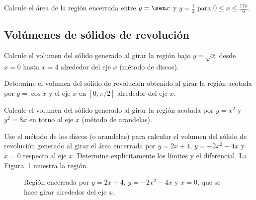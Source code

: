 
\begin{prob}
Calcule el área de la región encerrada entre $y = \sen x$ y $y = \frac{1}{2}$ para $0 \leq x \leq \frac{17\pi}{6}$.
\end{prob}

\subsection{Volúmenes de sólidos de revolución}


\begin{prob}
Calcule el volumen del sólido generado al girar la región bajo $y = \sqrt{x}$ desde $x = 0$ hasta $x = 4$ alrededor del eje $x$ (método de discos).
\end{prob}

\begin{prob}
Determine el volumen del sólido de revolución obtenido al girar la región acotada por $y = \cos x$ y el eje $x$ en $[0, \pi/2]$ alrededor del eje $x$.
\end{prob}


\begin{prob}
Calcule el volumen del sólido generado al girar la región acotada por $y = x^2$ y $y^2 = 8x$ en torno al eje $x$ (método de arandelas).
\end{prob}

\begin{prob}
Use el método de los discos (o arandelas) para calcular el volumen del sólido de revolución generado al girar el área encerrada por $y=2x+4$, $y=-2x^2-4x$ y $x=0$ respecto al eje $x$. Determine explícitamente los límites y el diferencial.
La Figura~\ref{fig:prob_volumen_discos} muestra la región.

\begin{figure}[!htbp]
\centering
{}
\caption{Región encerrada por $y=2x+4$, $y=-2x^2-4x$ y $x=0$, que se hace girar alrededor del eje $x$.}
\label{fig:prob_volumen_discos}
\end{figure}
\end{prob}

